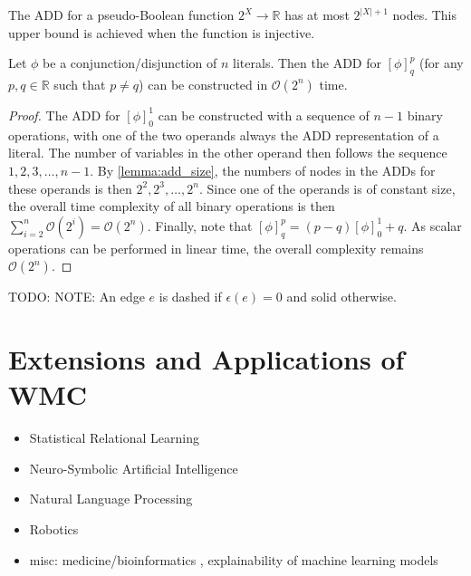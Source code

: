 \begin{fact} \label{lemma:add_size}
  The ADD for a pseudo-Boolean function $2^X \to \mathbb{R}$ has at most
  $2^{|X|+1}$ nodes. This upper bound is achieved when the function is
  injective.
\end{fact}

\begin{lemma} \label{lemma:clause_time}
  Let $\phi$ be a conjunction/disjunction of $n$ literals. Then the ADD for
  $[\phi]^p_q$ (for any $p, q \in \mathbb{R}$ such that $p \ne q$) can be
  constructed in $\mathcal{O}(2^n)$ time.
\end{lemma}
\begin{proof}
  The ADD for $[\phi]_0^1$ can be constructed with a sequence of $n-1$ binary
  operations, with one of the two operands always the ADD representation of a
  literal. The number of variables in the other operand then follows the
  sequence $1, 2, 3, \dots, n-1$. By \cref{lemma:add_size}, the numbers of nodes
  in the ADDs for these operands is then $2^2, 2^3,
  \dots, 2^n$. Since one of the operands is of constant size,
  the overall time complexity of all binary operations is then
  $\sum_{i=2}^n \mathcal{O}(2^i) = \mathcal{O}(2^n)$. Finally, note that
  $[\phi]_q^p = (p-q)[\phi]_0^1 + q$. As scalar operations can be performed in
  linear time, the overall complexity remains $\mathcal{O}(2^n)$.
\end{proof}

TODO: NOTE: An edge $e$ is dashed if $\epsilon(e) = 0$ and solid otherwise.

\section{Extensions and Applications of WMC}

\begin{itemize}
\item Statistical Relational Learning
\item Neuro-Symbolic Artificial Intelligence
\item Natural Language Processing \citep{DBLP:conf/aaai/CarlsonBKSHM10,DBLP:conf/ijcai/DriesKDBR17}
\item Robotics \citep{DBLP:conf/icra/MoldovanMOSR12,DBLP:conf/iros/MoldovanR14}
\item misc: medicine/bioinformatics \citep{DBLP:conf/ilp/Corte-RealD017,de2013phenetic}, explainability of machine learning models \citep{DBLP:conf/aaai/BroeckLSS21}
\end{itemize}

